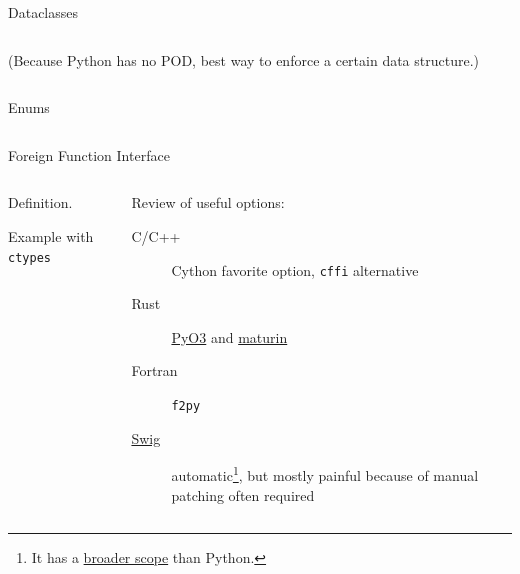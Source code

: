\documentclass[9pt]{beamer}
\begin{document}
\begin{frame}{Dataclasses}
    \begin{columns}
        \begin{column}{0.5\textwidth}
            (Because Python has no POD, best way to enforce a certain
            data structure.)
        \end{column}
        \begin{column}{0.5\textwidth}
        \end{column}
    \end{columns}
\end{frame}

\begin{frame}{Enums}
    \begin{columns}
        \begin{column}{0.5\textwidth}
        \end{column}
        \begin{column}{0.5\textwidth}
        \end{column}
    \end{columns}
\end{frame}

\begin{frame}{Foreign Function Interface}
    \begin{columns}
        \begin{column}{0.5\textwidth}
            Definition.

            Example with \texttt{ctypes}
        \end{column}
        \begin{column}{0.5\textwidth}
            Review of useful options:

            \begin{description}
                \item[C/C++] Cython favorite option, \texttt{cffi} alternative
                \item[Rust] \href{https://pyo3.rs/}{PyO3} and
                  \href{https://maturin.rs}{maturin}
                \item[Fortran] \texttt{f2py}
                \item[\href{https://www.swig.org/}{Swig}] automatic\footnote{
                    It has a
                    \href{https://www.swig.org/compat.html\#SupportedLanguages}{broader
                    scope} than Python.
                  }, but mostly
                  painful because of manual patching often required
            \end{description}
        \end{column}
    \end{columns}
\end{frame}
\end{document}
